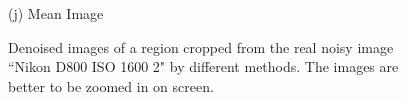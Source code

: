 \documentclass[10pt,onecolumn,letterpaper]{article}
\begin{document}
\begin{figure}[H]
{\begin{minipage}[t]{0.195\textwidth}
{\footnotesize (j) Mean Image \cite{crosschannel2016}}
\end{minipage}
}
\caption{Denoised images of a region cropped from the real noisy image ``Nikon D800 ISO 1600 2" \cite{crosschannel2016} by different methods. The images are better to be zoomed in on screen.}
\label{fig7}
\end{figure}


\begin{figure}[H]\vspace{1mm}
\centering
{}
\end{figure}
\end{document}
